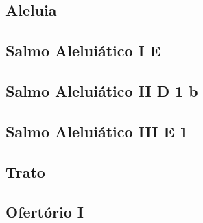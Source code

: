 \AllowPageFlush

\subsection{Aleluia}\label{subsection:liturgia-defunctorum/missa-pro-defunctis/alleluia}

\subsection[Salmo Aleluiático I]{Salmo Aleluiático I \textmd{E \protect\GreStar}}\label{subsection:liturgia-defunctorum/missa-pro-defunctis/psalmus-alleluiaticus-1}

\subsection[Salmo Aleluiático II]{Salmo Aleluiático II \textmd{D 1 b}}\label{subsection:liturgia-defunctorum/missa-pro-defunctis/psalmus-alleluiaticus-2}

\AllowPageFlush

\subsection[Salmo Aleluiático III]{Salmo Aleluiático III \textmd{E 1}}\label{subsection:liturgia-defunctorum/missa-pro-defunctis/psalmus-alleluiaticus-3}

\AllowPageFlush

\subsection{Trato}\label{subsection:liturgia-defunctorum/missa-pro-defunctis/tractus}

\AllowPageFlush

\subsection{Ofertório I}\label{subsection:liturgia-defunctorum/missa-pro-defunctis/offertorium-1}

\AllowPageFlush

